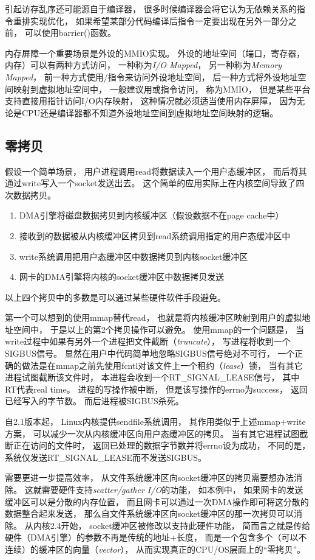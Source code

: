 \documentclass[11pt]{article}
\begin{document}
引起访存乱序还可能源自于编译器，
很多时候编译器会将它认为无依赖关系的指令重排实现优化，
如果希望某部分代码编译后指令一定要出现在另外一部分之前，
可以使用barrier()函数。

内存屏障一个重要场景是外设的MMIO实现。
外设的地址空间（端口，寄存器，内存）可以有两种方式访问，
一种称为{\em I/O Mapped}，
另一种称为{\em Memory Mapped}，
前一种方式使用/指令来访问外设地址空间，
后一种方式将外设地址空间映射到虚拟地址空间中，
一般建议用或指令访问，
称为MMIO，
但是某些平台支持直接用指针访问I/O内存映射，
这种情况就必须适当使用内存屏障，
因为无论是CPU还是编译器都不知道外设地址空间到虚拟地址空间映射的逻辑。

\subsection{零拷贝}
假设一个简单场景，
用户进程调用read将数据读入一个用户态缓冲区，
而后将其通过write写入一个socket发送出去。
这个简单的应用实际上在内核空间导致了四次数据拷贝。
\begin{enumerate}
  \item DMA引擎将磁盘数据拷贝到内核缓冲区（假设数据不在page cache中）
  \item 接收到的数据被从内核缓冲区拷贝到read系统调用指定的用户态缓冲区中
  \item write系统调用把用户态缓冲区中数据拷贝到内核socket缓冲区
  \item 网卡的DMA引擎将内核的socket缓冲区中数据拷贝发送
\end{enumerate}
以上四个拷贝中的多数是可以通过某些硬件软件手段避免。

第一个可以想到的使用mmap替代read，
也就是将内核缓冲区映射到用户的虚拟地址空间中，
于是以上的第2个拷贝操作可以避免。
使用mmap的一个问题是，
当write过程中如果有另外一个进程把文件截断（{\em truncate}），
写进程将收到一个SIGBUS信号。
显然在用户中代码简单地忽略SIGBUS信号绝对不可行，
一个正确的做法是在mmap之前先使用fcntl对该文件上一个租约（{\em lease}）锁，
当有其它进程试图截断该文件时，
本进程会收到一个RT\_SIGNAL\_LEASE信号，
其中RT代表real time。
进程的写操作被中断，
但是该写操作的errno为success，
返回已经写入的字节数。
而后进程被SIGBUS杀死。

自2.1版本起，
Linux内核提供sendfile系统调用，
其作用类似于上述mmap+write方案，
可以减少一次从内核缓冲区向用户态缓冲区的拷贝。
当有其它进程试图截断正在访问的文件时，
返回已处理的数据字节数并将errno设为成功，
不同的是，
系统仅发送RT\_SIGNAL\_LEASE而不发送SIGBUS。

需要更进一步提高效率，
从文件系统缓冲区向socket缓冲区的拷贝需要想办法消除。
这就需要硬件支持\emph{scatter/gather I/O}的功能，
如本例中，
如果网卡的发送缓冲区可以是分散的内存位置，
而且网卡可以通过一次DMA操作即可将这分散的数据整合起来发送，
那么自文件系统缓冲区向socket缓冲区的那一次拷贝可以消除。
从内核2.4开始，
socket缓冲区被修改以支持此硬件功能，
简而言之就是传给硬件（DMA引擎）的参数不再是传统的地址+长度，
而是一个包含多个（可以不连续）的缓冲区的向量（{\em vector}），
从而实现真正的CPU/OS层面上的``零拷贝''。
\end{document}
